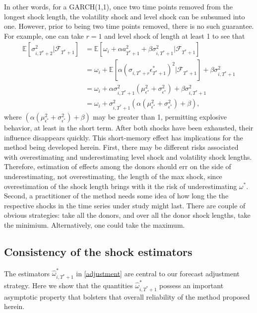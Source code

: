 \documentclass[11pt,3p,review,authoryear]{elsarticle}
\theoremstyle{definition}
\begin{document}
In other words, for a GARCH(1,1), once two time points removed from the longest shock length, the volatility shock and level shock can be subsumed into one.  However, prior to being two time points removed, there is no such guarantee.  For example, one can take $r = 1$ and level shock of length at least 1 to see that 
\begin{align*}
\mathbb{E}[ \sigma^{2}_{i,T^{*}+2} |\mathcal{F}_{T^{*}+1}] & = \mathbb{E}[\omega_{i} + \alpha a_{T^{*}+1}^{2} + \beta\sigma^{2}_{i,T^{*}+1} |\mathcal{F}_{T^{*}+1}] \\
& = \omega_{i} + \mathbb{E}[\alpha(\sigma_{i,T^{*}+r}\epsilon^{*}_{T^{*}+1})^{2} |\mathcal{F}_{T^{*}+1}] + \beta\sigma^{2}_{i,T^{*}+1} \\
& = \omega_{i} + \alpha\sigma^{2}_{i,T^{*}+1}(\mu^{2}_{\epsilon^{*}} + \sigma^{2}_{\epsilon^{*}}) + \beta\sigma^{2}_{i,T^{*}+1} \\
& = \omega_{i} + \sigma^{2}_{i,T^{*}+1}(\alpha(\mu^{2}_{\epsilon^{*}} + \sigma^{2}_{\epsilon^{*}}) + \beta)\text{,}
\end{align*}
where $(\alpha(\mu^{2}_{\epsilon^{*}} + \sigma^{2}_{\epsilon^{*}}) + \beta)$ may be greater than 1, permitting explosive behavior, at least in the short term.  After both shocks have been exhausted, their influence disappears quickly.  This short-memory effect has implications for the method being developed herein.  First, there may be different risks associated with overestimating and underestimating level shock and volatility shock lengths.  Therefore, estimation of effects among the donors should err on the side of underestimating, not overestimating, the length of the max shock, since overestimation of the shock length brings with it the risk of underestimating $\omega^{*}$.  Second, a practitioner of the method needs some idea of how long the the respective shocks in the time series under study might last.  There are couple of obvious strategies: take all the donors, and over all the donor shock lengths, take the minimium.  Alternatively, one could take the maximum.

\subsection{Consistency of the shock estimators}

The estimators $\hat\omega^{*}_{i,T^{*}+1}$ in \eqref{adjustment} are central to our forecast adjustment strategy.  Here we show that the quantities $\hat\omega^{*}_{i,T^{*}+1}$ possess an important asymptotic property that bolsters that overall reliability of the method proposed herein.
\end{document}

